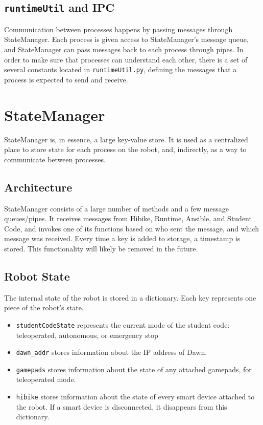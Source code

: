 \documentclass[12pt]{book}
\begin{document}
\subsection{\texttt{runtimeUtil} and IPC}
Communication between processes happens by passing messages through StateManager.
Each process is given access to StateManager's message queue, and StateManager can
pass messages back to each process through pipes.
In order to make sure that processes can understand each other, there is
a set of several constants located in \texttt{runtimeUtil.py}, defining the
messages that a process is expected to send and receive.

\section{StateManager}
StateManager is, in essence, a large key-value store. It is used as
a centralized place to store state for each process on the robot,
and, indirectly, as a way to communicate between processes.

\subsection{Architecture}
StateManager consists of a large number of methods and a few message queues/pipes.
It receives messages from Hibike, Runtime, Ansible, and Student Code, and invokes
one of its functions based on who sent the message, and which message
was received. Every time a key is added to storage,
a timestamp is stored. This functionality will likely be removed in the future.

\subsection{Robot State}
The internal state of the robot is stored in a dictionary. Each key represents
one piece of the robot's state.

\begin{itemize}
    \item \texttt{studentCodeState} represents the current mode of the student code:
        teleoperated, autonomous, or emergency stop
    \item \texttt{dawn\_addr} stores information about the IP address of Dawn.
    \item \texttt{gamepads} stores information about the state of any attached
        gamepads, for teleoperated mode.
    \item \texttt{hibike} stores information about the state of every smart device
        attached to the robot. If a smart device is disconnected, it disappears
        from this dictionary.
\end{itemize}
\end{document}
